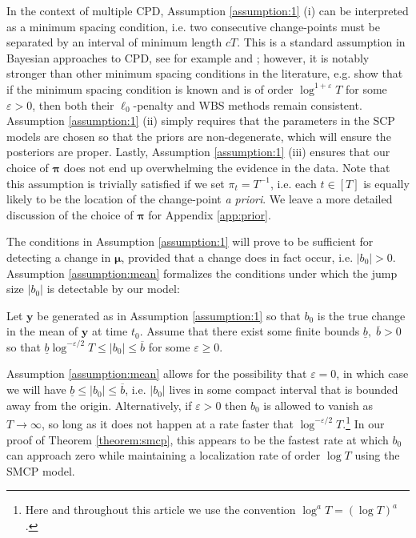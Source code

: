 In the context of multiple CPD, Assumption \ref{assumption:1} (i) can be interpreted as a minimum spacing condition, i.e. two consecutive change-points must be separated by an interval of minimum length $cT$. This is a standard assumption in Bayesian approaches to CPD, see for example \cite{Cappello22} and \cite{Cappello21}; however, it is notably stronger than other minimum spacing conditions in the literature, e.g. \cite{Wang2020_localization} show that if the minimum spacing condition is known and is of order $\log^{1+\varepsilon} T$ for some $\varepsilon > 0$, then both their $\ell_0$-penalty and WBS methods remain consistent. Assumption \ref{assumption:1} (ii) simply requires that the parameters in the SCP models are chosen so that the priors are non-degenerate, which will ensure the posteriors are proper. Lastly, Assumption \ref{assumption:1} (iii) ensures that our choice of $\pmb{\pi}$ does not end up overwhelming the evidence in the data. Note that this assumption is trivially satisfied if we set $\pi_t = T^{-1}$, i.e. each $t \in [T]$ is equally likely to be the location of the change-point \textit{a priori}. We leave a more detailed discussion of the choice of $\pmb{\pi}$ for Appendix \ref{app:prior}.

The conditions in Assumption \ref{assumption:1} will prove to be sufficient for detecting a change in $\pmb{\mu}$, provided that a change does in fact occur, i.e. $|b_0| > 0$. Assumption \ref{assumption:mean} formalizes the conditions under which the jump size $|b_0|$ is detectable by our model:
\begin{assumption}\label{assumption:mean}  Let $\mathbf{y}$ be generated as in Assumption \ref{assumption:1} so that $b_0$ is the true change in the mean of $\mathbf{y}$ at time $t_0$. Assume that there exist some finite bounds $\underline{b}, \; \overline{b} > 0$ so that $\underline{b}\log^{-\varepsilon/2}T \leq |b_0| \leq \overline{b}$ for some $\varepsilon \geq 0$.
\end{assumption}

\begin{remark}\label{rmk:1}
   Assumption \ref{assumption:mean} allows for the possibility that $\varepsilon = 0$, in which case we will have $\underline{b} \leq |b_0| \leq \overline{b}$, i.e. $|b_0|$ lives in some compact interval that is bounded away from the origin. Alternatively, if $\varepsilon >0$ then $b_0$ is allowed to vanish as $T \to \infty$, so long as it does not happen at a rate faster that $\log^{-\varepsilon/2}T$.\footnote{Here and throughout this article we use the convention $\log^{a}T = (\log T)^{a}$.} In our proof of Theorem \ref{theorem:smcp}, this appears to be the fastest rate at which $b_0$ can approach zero while maintaining a localization rate of order $\log T$ using the SMCP model. 
\end{remark}

